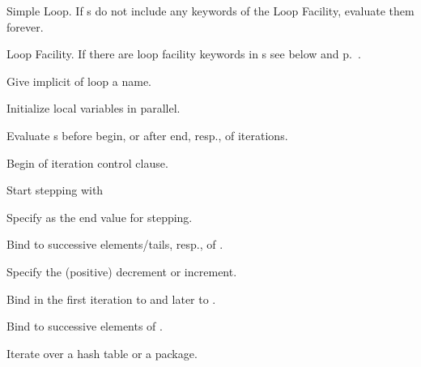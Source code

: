 \begin{LIST}{1cm}

  Simple Loop. If s do
  not include any keywords of the Loop Facility, evaluate them forever. 

  Loop Facility. If there are loop facility keywords in s
  see below and p.\ \pageref{loop-overview}.

  \begin{LIST}{.5cm}
    
    Give implicit  of loop a name.

    Initialize local variables in parallel.

    Evaluate s before begin, or after end, resp., of iterations.

    Begin of iteration control clause.

    \begin{LIST}{.5cm}

      Start stepping with 

      Specify  as the end value for stepping.

      Bind  to successive elements/tails, resp., of .

      Specify the (positive) decrement or increment.

      Bind  in the first iteration to   and later to .

      Bind  to successive elements of .

      Iterate over a hash table or a package.

      \begin{LIST}{.5cm}


\end{LIST}
\end{LIST}
\end{LIST}
\end{LIST}

